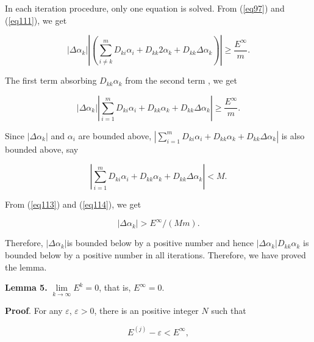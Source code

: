 \documentclass [18pt]{article}
\begin{document}
In each iteration procedure, only one equation is solved. From (\ref{eq97}) and
(\ref{eq111}), we get


\begin{equation}
\label{eq112}
\left| {\Delta \alpha _k } \right|\left| {(\sum\limits_{i \ne k}^m {D_{ki}
\alpha _i } + D_{kk} 2\alpha _k + D_{kk} \Delta \alpha _k )} \right| \ge
\frac{E^\infty }{m}.
\end{equation}



The first term absorbing $D_{kk} \alpha _k $ from the second term , we get


\begin{equation}
\label{eq113}
\left| {\Delta \alpha _k } \right|\left| {\sum\limits_{i = 1}^m {D_{ki}
\alpha _i } + D_{kk} \alpha _k + D_{kk} \Delta \alpha _k } \right| \ge
\frac{E^\infty }{m}.
\end{equation}



Since $\left| {\Delta \alpha _k } \right|$ and $\alpha _i $ are bounded
above, $\left| {\sum\limits_{i = 1}^m {D_{ki} \alpha _i } + D_{kk} \alpha _k
+ D_{kk} \Delta \alpha _k } \right|$ is also bounded above, say


\begin{equation}
\label{eq114}
\left| {\sum\limits_{i = 1}^m {D_{ki} \alpha _i } + D_{kk} \alpha _k +
D_{kk} \Delta \alpha _k } \right| < M.
\end{equation}



From (\ref{eq113}) and (\ref{eq114}), we get


\begin{equation}
\label{eq115}
\left| {\Delta \alpha _k } \right| > E^\infty / (Mm).
\end{equation}



Therefore, $\left| {\Delta \alpha _k } \right|$is bounded below by a
positive number and hence $\left| {\Delta \alpha _k } \right|D_{kk} \alpha
_k $ is bounded below by a positive number in all iterations. Therefore, we
have proved the lemma.

\textbf{Lemma 5. }$\mathop {\lim }\limits_{k \to \infty } E^k = 0$, that is,
$E^\infty = 0$.

\textbf{Proof}. For any $\varepsilon $, $\varepsilon > 0$, there is an
positive integer $N$ such that


\begin{equation}
\label{eq116}
E^{(j)} - \varepsilon < E^\infty ,
\end{equation}
\end{document}
